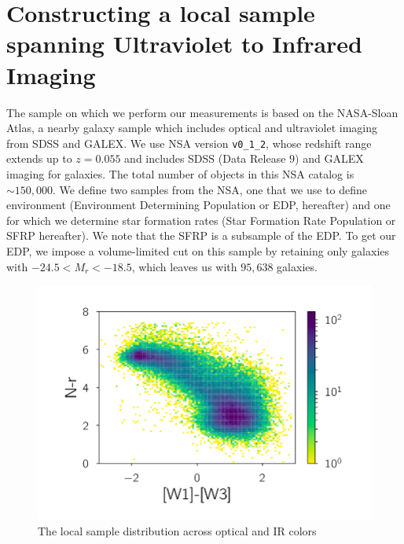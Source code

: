 \section{Constructing a local sample spanning Ultraviolet to Infrared Imaging}
\label{ch1_data}
The sample on which we perform our measurements is based on the NASA-Sloan Atlas, a nearby galaxy sample which includes optical and ultraviolet imaging from SDSS and GALEX. We use NSA version {\tt v0\_1\_2}, whose redshift range extends up to $z = 0.055$ and includes SDSS (Data Release $9$) and GALEX imaging for galaxies. The total number of objects in this NSA catalog is ${\sim}150,000$. We define two samples from the NSA, one that we use to define environment (Environment Determining Population or EDP, hereafter) and one for which we determine star formation rates (Star Formation Rate Population or SFRP hereafter). We note that the SFRP is a subsample of the EDP. To get our EDP, we impose a volume-limited cut on this sample by retaining only galaxies with $-24.5 <M_{r}< -18.5$, which leaves us with $95,638$ galaxies.\\

\begin{figure}
\includegraphics[width=\textwidth]{figures/sample}
\caption[Data: The local sample distribution across optical and IR colors]{The local sample distribution across optical and IR colors
\label{fig:sample}}
\end{figure}

